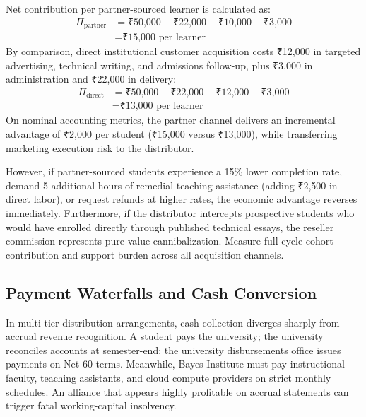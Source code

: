Net contribution per partner-sourced learner is calculated as:
\begin{equation}
\label{eq:partner_contribution}
\begin{aligned}
\Pi_{\text{partner}} &= \text{₹50,000} - \text{₹22,000} - \text{₹10,000} - \text{₹3,000} \\
&= \text{₹15,000 per learner}
\end{aligned}
\end{equation}
By comparison, direct institutional customer acquisition costs ₹12,000 in targeted advertising, technical writing, and admissions follow-up, plus ₹3,000 in administration and ₹22,000 in delivery:
\begin{equation}
\label{eq:direct_contribution}
\begin{aligned}
\Pi_{\text{direct}} &= \text{₹50,000} - \text{₹22,000} - \text{₹12,000} - \text{₹3,000} \\
&= \text{₹13,000 per learner}
\end{aligned}
\end{equation}
On nominal accounting metrics, the partner channel delivers an incremental advantage of ₹2,000 per student (₹15,000 versus ₹13,000), while transferring marketing execution risk to the distributor.

However, if partner-sourced students experience a 15\% lower completion rate, demand 5 additional hours of remedial teaching assistance (adding ₹2,500 in direct labor), or request refunds at higher rates, the economic advantage reverses immediately. Furthermore, if the distributor intercepts prospective students who would have enrolled directly through published technical essays, the reseller commission represents pure value cannibalization. Measure full-cycle cohort contribution and support burden across all acquisition channels.

\subsection{Payment Waterfalls and Cash Conversion}
\label{sec:payment_waterfalls_cash_conversion}

In multi-tier distribution arrangements, cash collection diverges sharply from accrual revenue recognition. A student pays the university; the university reconciles accounts at semester-end; the university disbursements office issues payments on Net-60 terms. Meanwhile, Bayes Institute must pay instructional faculty, teaching assistants, and cloud compute providers on strict monthly schedules. An alliance that appears highly profitable on accrual statements can trigger fatal working-capital insolvency.


